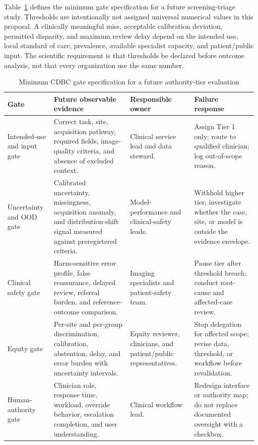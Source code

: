 \documentclass[conference]{IEEEtran}
\begin{document}
Table~\ref{tab:gatespec} defines the minimum gate specification for a future screening-triage study. Thresholds are intentionally not assigned universal numerical values in this proposal. A clinically meaningful miss, acceptable calibration deviation, permitted disparity, and maximum review delay depend on the intended use, local standard of care, prevalence, available specialist capacity, and patient/public input. The scientific requirement is that thresholds be declared before outcome analysis, not that every organization use the same number.

\begin{table}[t]
\caption{Minimum CDBC gate specification for a future authority-tier evaluation}
\label{tab:gatespec}
\centering
\footnotesize
\begin{tabular}{p{}p{}p{}p{}}
\toprule
\textbf{Gate} & \textbf{Future observable evidence} & \textbf{Responsible owner} & \textbf{Failure response}\\
\midrule
Intended-use and input gate & Correct task, site, acquisition pathway, required fields, image-quality criteria, and absence of excluded context. & Clinical service lead and data steward. & Assign Tier 1 only; route to qualified clinician; log out-of-scope reason.\\
Uncertainty and OOD gate & Calibrated uncertainty, missingness, acquisition anomaly, and distribution-shift signal measured against preregistered criteria. & Model-performance and clinical-safety leads. & Withhold higher tier; investigate whether the case, site, or model is outside the evidence envelope.\\
Clinical safety gate & Harm-sensitive error profile, false reassurance, delayed review, referral burden, and reference-outcome comparison. & Imaging specialists and patient-safety team. & Pause tier after threshold breach; conduct root-cause and affected-case review.\\
Equity gate & Per-site and per-group discrimination, calibration, abstention, delay, and error burden with uncertainty intervals. & Equity reviewer, clinicians, and patient/public representatives. & Stop delegation for affected scope; revise data, threshold, or workflow before revalidation.\\
Human-authority gate & Clinician role, response time, workload, override behavior, escalation completion, and user understanding. & Clinical workflow lead. & Redesign interface or authority map; do not replace documented oversight with a checkbox.\\

\end{tabular}
\end{table}
\end{document}
